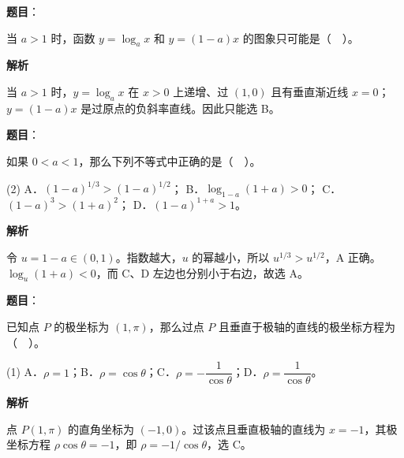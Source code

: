 \begin{answer}

\textbf{题目}：

当 $a>1$ 时，函数 $y=\log_a x$ 和 $y=(1-a)x$ 的图象只可能是（　）。
\nopagebreak[4]
\begin{center}\end{center}
\nopagebreak[4]
\textbf{解析}

当 $a>1$ 时，$y=\log_a x$ 在 $x>0$ 上递增、过 $(1,0)$ 且有垂直渐近线 $x=0$；$y=(1-a)x$ 是过原点的负斜率直线。因此只能选 B。


\end{answer}
\begin{answer}

\textbf{题目}：

如果 $0<a<1$，那么下列不等式中正确的是（　）。

\begin{gkopts}(2)
\task A．$(1-a)^{1/3}>(1-a)^{1/2}$；
\task B．$\log_{1-a}(1+a)>0$；
\task C．$(1-a)^3>(1+a)^2$；
\task D．$(1-a)^{1+a}>1$。
\end{gkopts}

\textbf{解析}

令 $u=1-a\in(0,1)$。指数越大，$u$ 的幂越小，所以 $u^{1/3}>u^{1/2}$，A 正确。$\log_u(1+a)<0$，而 C、D 左边也分别小于右边，故选 A。


\end{answer}
\begin{answer}

\textbf{题目}：

已知点 $P$ 的极坐标为 $(1,\pi)$，那么过点 $P$ 且垂直于极轴的直线的极坐标方程为（　）。

\begin{gkopts}(1)
\task A．$\rho=1$；B．$\rho=\cos\theta$；C．$\rho=-\dfrac1{\cos\theta}$；D．$\rho=\dfrac1{\cos\theta}$。
\end{gkopts}

\textbf{解析}

点 $P(1,\pi)$ 的直角坐标为 $(-1,0)$。过该点且垂直极轴的直线为 $x=-1$，其极坐标方程 $\rho\cos\theta=-1$，即 $\rho=-1/\cos\theta$，选 C。


\end{answer}
